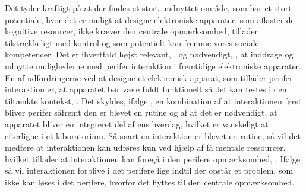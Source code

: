 Det tyder kraftigt på at der findes et stort uudnyttet område, som har et stort potentiale, hvor det er muligt at designe elektroniske apparater, som aflaster de kognitive resourcer, ikke kræver den centrale opmærksomhed, tillader tilstrækkeligt med kontrol og som potentielt kan fremme vores sociale kompetencer. Det er ihvertfald højst relevant, \parencite[s. 239]{PDF:PICharacteristicsAndConsiderations}, og nødvendigt, \parencite[s. 3]{PDF:TheComingAgeOfCalmTech}, at inddrage og udnytte mulighederne med perifer interaktion i fremtidige elektroniske apparater. \blankline
%
En af udfordringerne ved at designe et elektronisk apparat, som tillader perifer interaktion er, at apparatet bør være fuldt funktionelt så det kan testes i den tiltænkte kontekst, \parencite[s. 21]{PDF:EvaluatingPI}. Det skyldes, ifølge \textcite[s. 22]{PDF:EvaluatingPI}, en kombination af at interaktionen først bliver perifer såfremt den er blevet en rutine og af at det er nødvendigt, at apparatet bliver en integreret del af ens hverdag, hvilket er vanskeligt at efterligne i et laboratorium. Så snart en interaktion er blevet en rutine, så vil det medføre at interaktionen kan udføres kun ved hjælp af få mentale ressourcer, hvilket tillader at interaktionen kan foregå i den perifere opmærksomhed, \parencite[s. 2]{PDF:FacilitatingPIDesignAndEvaluation}. Ifølge \textcite[s. 14]{PDF:PeripheralInteraction} så vil interaktionen forblive i det perifere lige indtil der opstår et problem, som ikke kan løses i det perifere, hvorfor det flyttes til den centrale opmærksomhed.        





 
